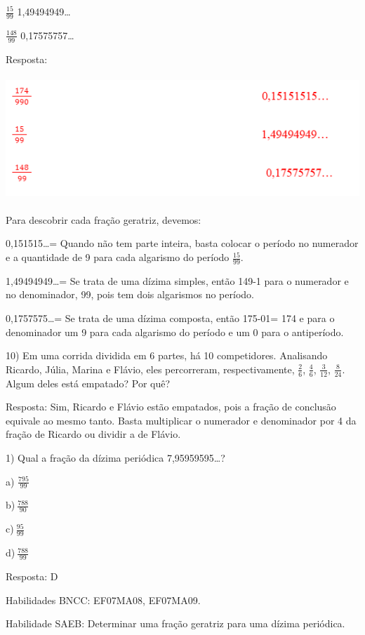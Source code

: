 \(\frac{15}{99}\) 1,49494949\ldots{}

\(\frac{148}{99}\) 0,17575757\ldots{}

Resposta:

\includegraphics[width=5.58333in,height=1.84375in]{./imgSAEB_7_MAT/media/image10.png}

Para descobrir cada fração geratriz, devemos:

0,151515\ldots= Quando não tem parte inteira, basta colocar o período no
numerador e a quantidade de 9 para cada algarismo do período
\(\frac{15}{99}\).

1,49494949\ldots= Se trata de uma dízima simples, então 149-1 para o
numerador e no denominador, 99, pois tem dois algarismos no período.

0,1757575\ldots= Se trata de uma dízima composta, então 175-01= 174 e
para o denominador um 9 para cada algarismo do período e um 0 para o
antiperíodo.

10) Em uma corrida dividida em 6 partes, há 10 competidores. Analisando
Ricardo, Júlia, Marina e Flávio, eles percorreram, respectivamente,
\(\frac{2}{6}\), \(\frac{4}{6}\), \(\frac{3}{12}\), \(\frac{8}{24}\).
Algum deles está empatado? Por quê?

Resposta: Sim, Ricardo e Flávio estão empatados, pois a fração de
conclusão equivale ao mesmo tanto. Basta multiplicar o numerador e
denominador por 4 da fração de Ricardo ou dividir a de Flávio.


1) Qual a fração da dízima periódica 7,95959595\ldots?

a) \(\frac{795}{99}\)

b)\(\ \frac{788}{90}\)

c)\(\ \frac{95}{99}\)

d)\(\ \frac{788}{99}\)

Resposta: D

Habilidades BNCC: EF07MA08, EF07MA09.

Habilidade SAEB: Determinar uma fração geratriz para uma dízima
periódica.

